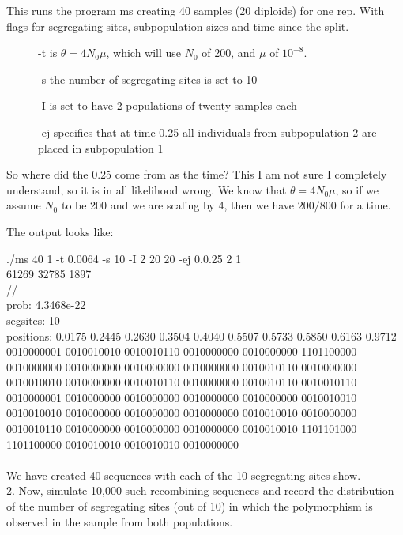 \documentclass[11pt, oneside]{article}
\begin{document}
\noindent
This runs the program ms creating 40 samples (20 diploids) for one rep. With flags 
for segregating sites, subpopulation sizes and time since the split.

\begin{description}
	\item[] -t is $\theta=4N_0\mu$, which will use $N_0$ of 200, and $\mu$ of $10^{-8}$.
	\item[] -s the number of segregating sites is set to 10
	\item[] -I is set to have 2 populations of twenty samples each
	\item[] -ej specifies that at time 0.25 all individuals from subpopulation 2 are placed
		in subpopulation 1
\end{description}

So where did the 0.25 come from as the time? This I am not sure I completely understand, so 
it is in all likelihood wrong. We know that $\theta=4N_0 \mu$, so if we assume $N_0$ to 
be 200 and we are scaling by 4, then we have $200/800$ for a time. 

\noindent
The output looks like:

\noindent
./ms 40 1 -t 0.0064 -s 10 -I 2 20 20 -ej 0.0.25 2 1\\ 
61269 32785 1897\\
//\\
prob: 4.3468e-22\\
segsites: 10\\
positions: 0.0175 0.2445 0.2630 0.3504 0.4040 0.5507 0.5733 0.5850 0.6163 0.9712 \\
0010000001
0010010010
0010010110
0010000000
0010000000
1101100000
0010000000
0010000000
0010000000
0010000000
0010010110
0010000000
0010010010
0010000000
0010010110
0010000000
0010010110
0010010110
0010000001
0010000000
0010000000
0010000000
0010000000
0010010010
0010010010
0010000000
0010000000
0010000000
0010010010
0010000000
0010010110
0010000000
0010000000
0010000000
0010010010
1101101000
1101100000
0010010010
0010010010
0010000000\\
\noindent\\
We have created 40 sequences with each of the 10 segregating sites show. \\

2. Now, simulate 10,000 such recombining sequences and record the distribution of 
the number of segregating sites (out of 10) in which the polymorphism is observed 
in the sample from both populations.\\
\end{document}
